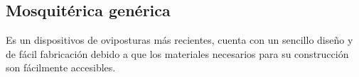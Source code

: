 \subsection{Mosquitérica genérica}
Es un dispositivos de oviposturas más recientes, cuenta con un sencillo
diseño y de fácil fabricación debido a que los materiales necesarios para
su construcción son fácilmente accesibles.
